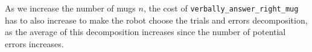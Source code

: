 \documentclass[a4paper,11pt,twoside]{StyleThese}
\begin{document}
As we increase the number of mugs $n$, the cost of \verb'verbally_answer_right_mug' has to also increase to make the robot choose the trials and errors decomposition, as the average of this decomposition increases since the number of potential errors increases. 
\begin{table}[htb]
\centering
{}
\caption{Planning computation durations depending on the specified number of mugs on the table.}
\label{tab:plannertime}
\end{table}
\end{document}

